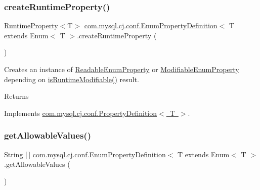 \subsubsection{\texorpdfstring{create\+Runtime\+Property()}{createRuntimeProperty()}}
{\footnotesize\ttfamily \mbox{\hyperlink{interfacecom_1_1mysql_1_1cj_1_1conf_1_1_runtime_property}{Runtime\+Property}}$<$T$>$ \mbox{\hyperlink{classcom_1_1mysql_1_1cj_1_1conf_1_1_enum_property_definition}{com.\+mysql.\+cj.\+conf.\+Enum\+Property\+Definition}}$<$ T extends Enum$<$ T $>$.create\+Runtime\+Property (\begin{DoxyParamCaption}{ }\end{DoxyParamCaption})}

Creates an instance of \mbox{\hyperlink{classcom_1_1mysql_1_1cj_1_1conf_1_1_readable_enum_property}{Readable\+Enum\+Property}} or \mbox{\hyperlink{classcom_1_1mysql_1_1cj_1_1conf_1_1_modifiable_enum_property}{Modifiable\+Enum\+Property}} depending on \mbox{\hyperlink{classcom_1_1mysql_1_1cj_1_1conf_1_1_abstract_property_definition_a6c98140b2db84ccd0ff29ce165ec9ef5}{is\+Runtime\+Modifiable()}} result.

\begin{DoxyReturn}{Returns}

\end{DoxyReturn}


Implements \mbox{\hyperlink{interfacecom_1_1mysql_1_1cj_1_1conf_1_1_property_definition_a60e957593314e41c73275bd5f4c6708e}{com.\+mysql.\+cj.\+conf.\+Property\+Definition$<$ T $>$}}.

\mbox{\label{classcom_1_1mysql_1_1cj_1_1conf_1_1_enum_property_definition_a7e2ff8f6f7baf418abdae017a6bd8136}} 
\subsubsection{\texorpdfstring{get\+Allowable\+Values()}{getAllowableValues()}}
{\footnotesize\ttfamily String \mbox{[}$\,$\mbox{]} \mbox{\hyperlink{classcom_1_1mysql_1_1cj_1_1conf_1_1_enum_property_definition}{com.\+mysql.\+cj.\+conf.\+Enum\+Property\+Definition}}$<$ T extends Enum$<$ T $>$.get\+Allowable\+Values (\begin{DoxyParamCaption}{ }\end{DoxyParamCaption})}

